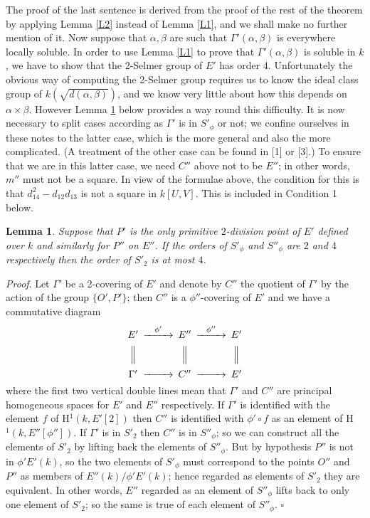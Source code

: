 \documentclass[12pt]{article}
\def\ga{{\alpha}}
\def\gb{{\beta}}
\def\gG{{\Gamma}}
\def\qed{{\hfill$\square$}}
\def\ble{\begin{lemma} \label}
\def\ele{\end{lemma}}
\newtheorem{lemma}{Lemma}
\begin{document}
The proof of the last sentence is derived from the proof of
the rest of the theorem by applying Lemma \ref{L2} instead of
Lemma \ref{L1}, and we shall make no further mention of it.
Now suppose that $\ga,\gb$ are such that $\gG'(\ga,\gb)$ is
everywhere locally soluble. In order to use Lemma \ref{L1} to
prove that $\gG'(\ga,\gb)$ is soluble in $k$, we have to show
that the 2-Selmer group of $E'$ has order 4. Unfortunately the
obvious way of computing the 2-Selmer group requires us to
know the ideal class group of $k(\sqrt{d(\ga,\gb)})$, and we
know very little about how this depends on $\ga\times\gb$.
However Lemma \ref{L22} below provides a way round this
difficulty. It is now
necessary to split cases according as $\gG'$ is in $S'_\phi$
or not; we confine ourselves in these notes to the latter
case, which is the more general and also the more complicated.
(A treatment of the other case can be found in [1] or
[3].) To ensure that we are in this latter case, we need
$C''$ above not to be $E''$; in other words, $m''$ must not
be a square. In view of the formulae above, the condition for
this is that $d_{14}^2-d_{12}d_{13}$ is not a square in
$k[U,V]$. This is included in Condition 1 below.
\ble{L22} Suppose that $P'$ is the only primitive
$2$-division point of $E'$ defined over $k$ and similarly for
$P''$ on $E''$. If the orders of $S'_\phi$ and $S''_\phi$ are
$2$ and $4$ respectively then the order of $S'_2$ is at most
$4$. \ele
\emph{Proof}. Let $\gG'$ be a 2-covering of $E'$ and denote
by $C''$ the quotient of $\gG'$ by the action of the group
$\{O',P'\}$; then $C''$ is a $\phi''$-covering of $E'$ and
we have a commutative diagram
\[ \begin{CD}
E' @>{\phi'}>> E'' @>{\phi''}>> E' \\
@|           @|              @| \\
\gG' @>>>      C'' @>>>         E'
\end{CD} \]
where the first two vertical double lines mean that $\gG'$
and $C''$ are principal homogeneous spaces for $E'$ and $E''$
respectively. If $\gG'$ is identified with the element $f$ of
H$^1(k,E'[2])$ then $C''$ is identified with $\phi'\circ f$
as an element of H$^1(k,E''[\phi''])$. If $\gG'$ is in $S'_2$
then $C''$ is in $S''_\phi$; so we can construct all the
elements of $S'_2$ by lifting back the elements of $S''_\phi$.
But by hypothesis $P''$ is not in $\phi'E'(k)$, so the two
elements of $S'_\phi$ must correspond to the points $O''$ and
$P''$ as members of $E''(k)/\phi'E'(k)$; hence regarded as
elements of $S'_2$ they are equivalent. In other words,
$E''$ regarded as an element of $S''_\phi$ lifts back to only
one element of $S'_2$; so the same is true of each
element of $S''_\phi$.  \qed
\end{document}
